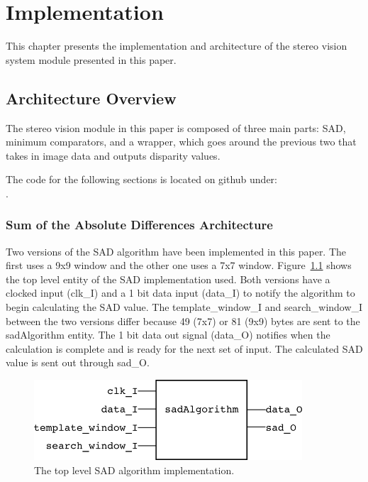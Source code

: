 
\chapter{Implementation}
\label{sec:impl}

This chapter presents the implementation and architecture of the stereo vision system module presented in this paper.

\section{Architecture Overview}

The stereo vision module in this paper is composed of three main parts: SAD, minimum comparators, and a wrapper, which goes around the previous two that takes in image data and outputs disparity values.

The code for the following sections is located on github under:
\\.

\subsection{Sum of the Absolute Differences Architecture}

Two versions of the SAD algorithm have been implemented in this paper. The first uses a 9x9 window and the other one uses a 7x7 window. Figure~\ref{fig:sadAlg_rtl} shows the top level entity of the SAD implementation used. Both versions have a clocked input (clk\_I) and a 1 bit data input (data\_I) to notify the algorithm to begin calculating the SAD value. The template\_window\_I and search\_window\_I between the two versions differ because 49 (7x7) or 81 (9x9) bytes are sent to the sadAlgorithm entity. The 1 bit data out signal (data\_O) notifies when the calculation is complete and is ready for the next set of input. The calculated SAD value is sent out through sad\_O.

\begin{figure}
	\begin{center}
		\includegraphics[width=100mm]{figures/sadAlgorithm_rtl.png}
		\captionfonts
		\caption{The top level SAD algorithm implementation.}
		\label{fig:sadAlg_rtl}
	\end{center}
\end{figure}

